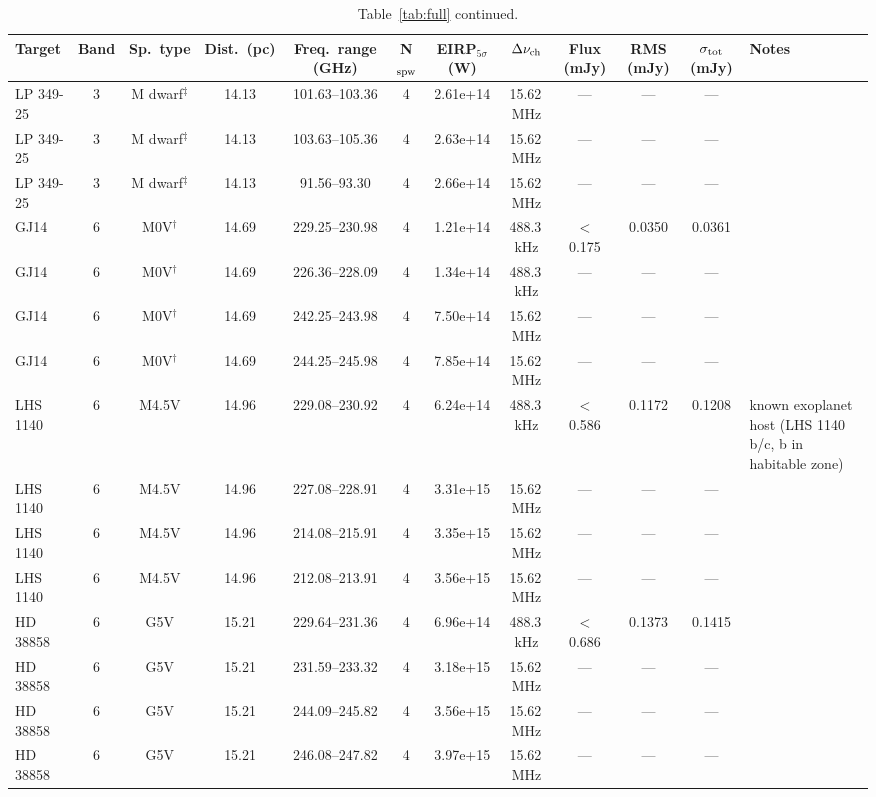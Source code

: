 \documentclass{openjournal}
\begin{document}
\begin{table}
\centering
\scriptsize
\setlength{\tabcolsep}{2pt}
\caption{Table~\ref{tab:full} continued.}
\label{tab:full6}
\begin{tabularx}{\textwidth}{@{}l c c c c c c c c c c X@{}}
\hline
Target & Band & Sp.\ type & Dist.\ (pc) & Freq.\ range (GHz) & N$_{\rm spw}$ & EIRP$_{5\sigma}$ (W) & $\Delta\nu_{\rm ch}$ & Flux (mJy) & RMS (mJy) & $\sigma_{\rm tot}$ (mJy) & Notes \\
\hline
 LP  349-25 & 3 & M dwarf$^\ddagger$ & 14.13 & 101.63--103.36 & 4 & 2.61e+14 & 15.62\,MHz & --- & --- & --- &  \\
 LP  349-25 & 3 & M dwarf$^\ddagger$ & 14.13 & 103.63--105.36 & 4 & 2.63e+14 & 15.62\,MHz & --- & --- & --- &  \\
 LP  349-25 & 3 & M dwarf$^\ddagger$ & 14.13 & 91.56--93.30 & 4 & 2.66e+14 & 15.62\,MHz & --- & --- & --- &  \\
 GJ14 & 6 & M0V$^\dagger$ & 14.69 & 229.25--230.98 & 4 & 1.21e+14 & 488.3\,kHz & $<$0.175 & 0.0350 & 0.0361 &  \\
 GJ14 & 6 & M0V$^\dagger$ & 14.69 & 226.36--228.09 & 4 & 1.34e+14 & 488.3\,kHz & --- & --- & --- &  \\
 GJ14 & 6 & M0V$^\dagger$ & 14.69 & 242.25--243.98 & 4 & 7.50e+14 & 15.62\,MHz & --- & --- & --- &  \\
 GJ14 & 6 & M0V$^\dagger$ & 14.69 & 244.25--245.98 & 4 & 7.85e+14 & 15.62\,MHz & --- & --- & --- &  \\
 LHS 1140 & 6 & M4.5V & 14.96 & 229.08--230.92 & 4 & 6.24e+14 & 488.3\,kHz & $<$0.586 & 0.1172 & 0.1208 & known exoplanet host (LHS 1140 b/c, b in habitable zone) \\
 LHS 1140 & 6 & M4.5V & 14.96 & 227.08--228.91 & 4 & 3.31e+15 & 15.62\,MHz & --- & --- & --- &  \\
 LHS 1140 & 6 & M4.5V & 14.96 & 214.08--215.91 & 4 & 3.35e+15 & 15.62\,MHz & --- & --- & --- &  \\
 LHS 1140 & 6 & M4.5V & 14.96 & 212.08--213.91 & 4 & 3.56e+15 & 15.62\,MHz & --- & --- & --- &  \\
 HD 38858 & 6 & G5V & 15.21 & 229.64--231.36 & 4 & 6.96e+14 & 488.3\,kHz & $<$0.686 & 0.1373 & 0.1415 &  \\
 HD 38858 & 6 & G5V & 15.21 & 231.59--233.32 & 4 & 3.18e+15 & 15.62\,MHz & --- & --- & --- &  \\
 HD 38858 & 6 & G5V & 15.21 & 244.09--245.82 & 4 & 3.56e+15 & 15.62\,MHz & --- & --- & --- &  \\
 HD 38858 & 6 & G5V & 15.21 & 246.08--247.82 & 4 & 3.97e+15 & 15.62\,MHz & --- & --- & --- &  \\

\end{tabularx}
\end{table}
\end{document}

